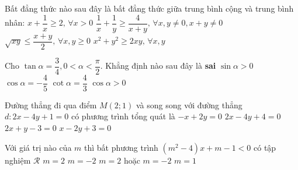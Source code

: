 \begin{ex}%
Bất đẳng thức nào sau đây là bất đẳng thức giữa trung bình cộng và trung bình nhân:
	\choice	
	{$x+\dfrac{1}{x}\ge 2,\, \forall x>0$}
	{$\dfrac{1}{x}+\dfrac{1}{y}\ge \dfrac{4}{x+y}, \, \forall x,y\neq 0, x+y\neq 0$}
	{\True$ \sqrt{xy}\le \dfrac{x+y}{2},\, \forall x,y\ge 0$}
	{$x^2+y^2\ge 2xy,\, \forall x,y$}	
\end{ex}
\begin{ex}%
Cho $\tan \alpha=\dfrac{3}{4},0<\alpha<\dfrac{\pi}{2}$. Khẳng định nào sau đây là \textbf{sai}
	\choice	
	{$\sin \alpha>0$}
	{\True $\cos \alpha =-\dfrac{4}{5}$}
	{$\cot \alpha =\dfrac{4}{3}$}
	{$\cos \alpha>0$}	
\end{ex}
\begin{ex}%
Đường thẳng đi qua điểm $M(2;1)$ và song song với đường thẳng $d:2x-4y+1=0$ có phương trình tổng quát là
	\choice	
	{\True $-x+2y=0$}
	{$2x-4y+4=0$}
	{$2x+y-3=0$}
	{$x-2y+3=0$}	
\end{ex}
\begin{ex}%
Với giá trị nào của $m$ thì bất phương trình $\left(m^2-4\right)x+m-1<0$ có tập nghiệm $\mathscr{R}$
	\choice	
	{$m=2$}
	{\True $m=-2$}
	{$m=2$ hoặc $m=-2$}
	{$m=1$}	
\end{ex}
